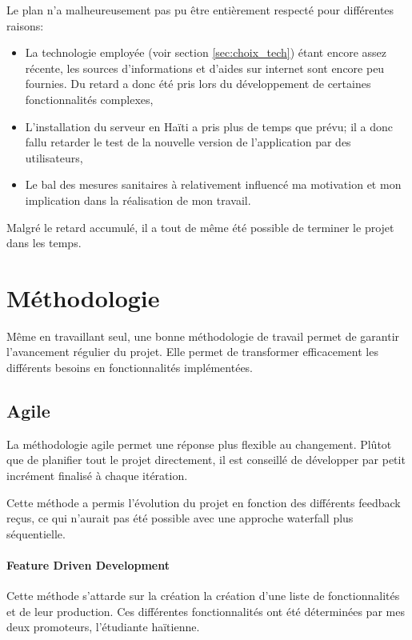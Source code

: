 \documentclass{EPL-master-thesis-covers-FR}
\begin{document}
				Le plan n'a malheureusement pas pu être entièrement respecté pour différentes raisons:
				\begin{itemize}
					\item La technologie employée (voir section \ref{sec:choix_tech}) étant encore assez récente, les sources d'informations et d'aides sur internet sont encore peu fournies. Du retard a donc été pris lors du développement de certaines fonctionnalités complexes,
					\item L'installation du serveur en Haïti a pris plus de temps que prévu; il a donc fallu retarder le test de la nouvelle version de l'application par des utilisateurs,
					\item Le bal des mesures sanitaires à relativement influencé ma motivation et mon implication dans la réalisation de mon travail.
				\end{itemize}				
				
				Malgré le retard accumulé, il a tout de même été possible de terminer le projet dans les temps.
				
				
				
		\section{Méthodologie}
			Même en travaillant seul, une bonne méthodologie de travail permet de garantir l'avancement régulier du projet. Elle permet de transformer efficacement les différents besoins en fonctionnalités implémentées.
			

			\subsection*{Agile}
				La méthodologie agile permet une réponse plus flexible au changement. Plûtot que de planifier tout le projet directement, il est conseillé de développer par petit incrément finalisé à chaque itération. 
				
				Cette méthode a permis l'évolution du projet en fonction des différents feedback reçus, ce qui n'aurait pas été possible avec une approche waterfall plus séquentielle.
				
				\paragraph*{Feature Driven Development} Cette méthode s'attarde sur la création la création d'une liste de fonctionnalités et de leur production. Ces différentes fonctionnalités ont été déterminées par mes deux promoteurs, l'étudiante haïtienne.
				
\end{document}
